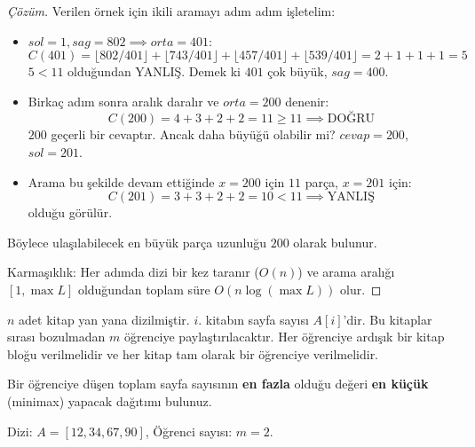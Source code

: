 \begin{proof}[Çözüm]
Verilen örnek için ikili aramayı adım adım işletelim:
\begin{itemize}
    \item $sol = 1, sag = 802 \implies orta = 401$:
    \[ C(401) = \lfloor 802/401 \rfloor + \lfloor 743/401 \rfloor + \lfloor 457/401 \rfloor + \lfloor 539/401 \rfloor = 2 + 1 + 1 + 1 = 5 \]
    $5 < 11$ olduğundan YANLIŞ. Demek ki $401$ çok büyük, $sag = 400$.
    \item Birkaç adım sonra aralık daralır ve $orta = 200$ denenir:
    \[ C(200) = 4 + 3 + 2 + 2 = 11 \ge 11 \implies \text{DOĞRU} \]
    $200$ geçerli bir cevaptır. Ancak daha büyüğü olabilir mi? $cevap = 200$, $sol = 201$.
    \item Arama bu şekilde devam ettiğinde $x = 200$ için $11$ parça, $x = 201$ için:
    \[ C(201) = 3 + 3 + 2 + 2 = 10 < 11 \implies \text{YANLIŞ} \]
    olduğu görülür.
\end{itemize}
Böylece ulaşılabilecek en büyük parça uzunluğu $200$ olarak bulunur.

Karmaşıklık: Her adımda dizi bir kez taranır ($O(n)$) ve arama aralığı $[1, \max L]$ olduğundan toplam süre $O(n \log(\max L))$ olur.
\end{proof}

\begin{example}
$n$ adet kitap yan yana dizilmiştir. $i$. kitabın sayfa sayısı $A[i]$'dir. Bu kitaplar sırası bozulmadan $m$ öğrenciye paylaştırılacaktır. Her öğrenciye ardışık bir kitap bloğu verilmelidir ve her kitap tam olarak bir öğrenciye verilmelidir.

Bir öğrenciye düşen toplam sayfa sayısının \textbf{en fazla} olduğu değeri \textbf{en küçük} (minimax) yapacak dağıtımı bulunuz.

Dizi: $A = [12, 34, 67, 90]$, Öğrenci sayısı: $m = 2$.
\end{example}

